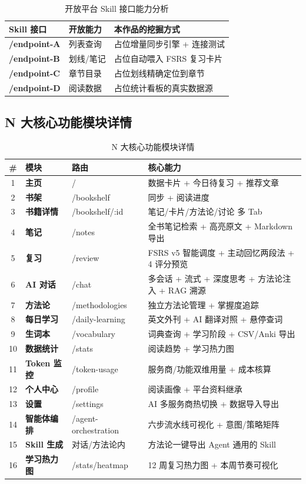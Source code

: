 \documentclass[12pt,a4paper,nomath]{harryopo-report}
\begin{document}
\begin{table}[htbp]
\centering
\begin{tabularx}{\textwidth}{>{\bfseries}l X X}
\toprule
\textbf{Skill 接口} & \textbf{开放能力} & \textbf{本作品的挖掘方式} \\
\midrule
/endpoint-A & 列表查询 & {占位}增量同步引擎 + 连接测试 \\
/endpoint-B & 划线/笔记 & {占位}自动喂入 FSRS 复习卡片 \\
/endpoint-C & 章节目录 & {占位}划线精确定位到章节 \\
/endpoint-D & 阅读数据 & {占位}统计看板的真实数据源 \\
\bottomrule
\end{tabularx}
\caption{开放平台 Skill 接口能力分析}
\label{tab:skill}
\end{table}

\subsection{N 大核心功能模块详情}
\begin{table}[htbp]
\centering
\begin{tabularx}{\textwidth}{c >{\bfseries}l l X}
\toprule
\textbf{\#} & \textbf{模块} & \textbf{路由} & \textbf{核心能力} \\
\midrule
1 & 主页 & / & 数据卡片 + 今日待复习 + 推荐文章 \\
2 & 书架 & /bookshelf & 同步 + 阅读进度 \\
3 & 书籍详情 & /bookshelf/:id & 笔记/卡片/方法论/讨论 多 Tab \\
4 & 笔记 & /notes & 全书笔记检索 + 高亮原文 + Markdown 导出 \\
5 & 复习 & /review & FSRS v5 智能调度 + 主动回忆两段法 + 4 评分预览 \\
6 & AI 对话 & /chat & 多会话 + 流式 + 深度思考 + 方法论注入 + RAG 溯源 \\
7 & 方法论 & /methodologies & 独立方法论管理 + 掌握度追踪 \\
8 & 每日学习 & /daily-learning & 英文外刊 + AI 翻译对照 + 悬停查词 \\
9 & 生词本 & /vocabulary & 词典查询 + 学习阶段 + CSV/Anki 导出 \\
10 & 数据统计 & /stats & 阅读趋势 + 学习热力图 \\
11 & Token 监控 & /token-usage & 服务商/功能双维用量 + 成本核算 \\
12 & 个人中心 & /profile & 阅读画像 + 平台资料继承 \\
13 & 设置 & /settings & AI 多服务商热切换 + 数据导入导出 \\
14 & 智能体编排 & /agent-orchestration & 六步流水线可视化 + 意图/策略矩阵 \\
15 & Skill 生成 & 对话/方法论内 & 方法论一键导出 Agent 通用的 Skill \\
16 & 学习热力图 & /stats/heatmap & 12 周复习热力图 + 本周节奏可视化 \\
\bottomrule
\end{tabularx}
\caption{N 大核心功能模块详情}
\label{tab:modules}
\end{table}
\end{document}
